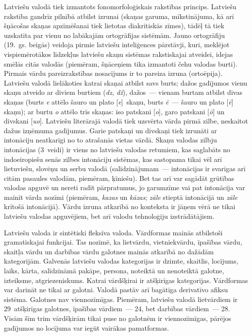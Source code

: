 \begin{multicols}{2}
Latviešu valodā tiek izmantots fonomorfoloģiskais rakstības princips.
Latviešu rakstība gandrīz pilnībā atbilst izrunai (skaņas garuma, mīkstinājuma, kā arī šņācošas skaņas apzīmēšanai tiek lietotas diakritiskās zīmes), tādēļ tā tiek uzskatīta par vienu no labākajām ortogrāfijas sistēmām.
Jauno ortogrāfiju (19.~gs. beigās) veidoja pirmie latviešu inteliģences pārstāvji, kuri, meklējot vispiemērotākos līdzekļus latviešu skaņu sistēmas rakstiskajai atveidei, idejas smēlās citās valodās (piemēram, šņāceņiem tika izmantoti čehu valodas burti).
Pirmais vārdu pareizrakstības nosacījums ir to pareiza izruna (ortoēpija).
Latviešu valodā lielākoties katrai skaņai atbilst savs burts; dažos gadījumos vienu skaņu atveido ar diviem burtiem (\textit{dz, dž}), dažos~--- vienam burtam atbilst divas skaņas (burts \textit{e} attēlo šauro un plato [\textit{e}]~skaņu, burts \textit{ē}~--- šauro un plato [\textit{ē}] skaņu); ar burtu \textit{o} attēlo trīs skaņas: īso patskani [\textit{o}], garo patskani [\textit{ō}] un divskani [\textit{uo}].
Latviešu literārajā valodā tiek uzsvērta vārda pirmā zilbe, neskaitot dažus izņēmuma gadījumus.
Garie patskaņi un divskaņi tiek izrunāti ar intonāciju neatkarīgi no to atrašanās vietas vārdā.
Skaņu valodas zilbju intonācijas (3~veidi) ir viens no latviešu valodas retumiem, kas saglabāts no indoeiropiešu senās zilbes intonāciju sistēmas, kas sastopama tikai vēl arī lietuviešu, slovēņu un serbu valodā (salīdzinājumam~--- intonācijas ir svarīgas arī citām pasaules valodām, piemēram, ķīniešu).
Bet tas arī var sagādāt grūtības valodas apguvē un nereti radīt pārpratumus, jo garumzīme vai pat intonācija var mainīt vārda nozīmi (piemēram, \textit{kazas} un \textit{kāzas}; \textit{zāle} stieptā intonācijā un \textit{zāle} krītošā intonācijā).
Vārdu izruna atkarībā no konteksta ir jāņem vērā ne tikai latviešu valodas apguvējiem, bet arī valodu tehnoloģiju izstrādātājiem.


Latviešu valoda ir sintētiski fleksīva valoda.
Vārdformas mainās atbilstoši gramatiskajai funkcijai.
Tas nozīmē, ka lietvārdu, vietniekvārdu, īpašības vārdu, skaitļa vārdu un darbības vārdu galotnes mainās atkarībā no dažādām kategorijām.
Galvenās latviešu valodas kategorijas ir dzimte, skaitlis, locījums, laiks, kārta, salīdzināmā pakāpe, persona, noteiktā un nenoteiktā galotne, izteiksme, atgriezeniskums.
Katrai vārdšķirai ir atšķirīgas kategorijas.
Vārdformas var darināt ne tikai ar galotni.
Valodā pastāv arī bagātīga derivatīvo afiksu sistēma.
Galotnes nav viennozīmīgas.
Piemēram, latviešu valodā lietvārdiem ir 29~atšķirīgas galotnes, īpašības vārdiem~--- 24, bet darbības vārdiem~--- 28.
Visām šīm trim vārdšķirām tikai puse no galotnēm ir viennozīmīgas, pārējos gadījumos no locījuma var iegūt vairākas pamatformas.


\end{multicols}
